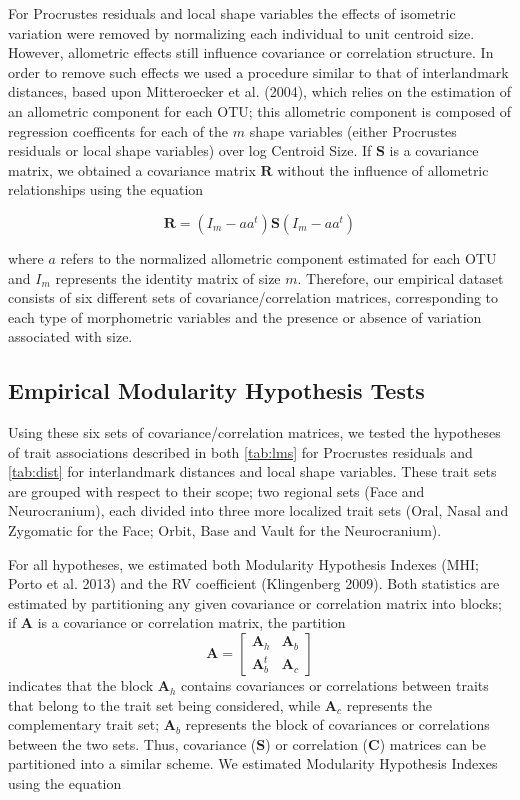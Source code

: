 \documentclass[12pt,]{article}
\begin{document}
For Procrustes residuals and local shape variables the effects of
isometric variation were removed by normalizing each individual to unit
centroid size. However, allometric effects still influence covariance or
correlation structure. In order to remove such effects we used a
procedure similar to that of interlandmark distances, based upon
Mitteroecker et al. (2004), which relies on the estimation of an
allometric component for each OTU; this allometric component is composed
of regression coefficents for each of the $m$ shape variables (either
Procrustes residuals or local shape variables) over log Centroid Size.
If $\mathbf{S}$ is a covariance matrix, we obtained a covariance matrix
$\mathbf{R}$ without the influence of allometric relationships using the
equation

\begin{equation}
\mathbf{R} = (I_m - aa^t) \mathbf{S} (I_m - aa^t)
\label{eq:allo}
\end{equation}

where $a$ refers to the normalized allometric component estimated for
each OTU and $I_m$ represents the identity matrix of size $m$.
Therefore, our empirical dataset consists of six different sets of
covariance/correlation matrices, corresponding to each type of
morphometric variables and the presence or absence of variation
associated with size.

\subsection{Empirical Modularity Hypothesis
Tests}\label{empirical-modularity-hypothesis-tests}

Using these six sets of covariance/correlation matrices, we tested the
hypotheses of trait associations described in both \autoref{tab:lms} for
Procrustes residuals and \autoref{tab:dist} for interlandmark distances
and local shape variables. These trait sets are grouped with respect to
their scope; two regional sets (Face and Neurocranium), each divided
into three more localized trait sets (Oral, Nasal and Zygomatic for the
Face; Orbit, Base and Vault for the Neurocranium).

For all hypotheses, we estimated both Modularity Hypothesis Indexes
(MHI; Porto et al. 2013) and the RV coefficient (Klingenberg 2009). Both
statistics are estimated by partitioning any given covariance or
correlation matrix into blocks; if $\mathbf{A}$ is a covariance or
correlation matrix, the partition \[
\mathbf{A} =
\begin{bmatrix}
\mathbf{A}_h & \mathbf{A}_b \\
\mathbf{A}^t_b & \mathbf{A}_c
\end{bmatrix}
\] indicates that the block $\mathbf{A}_h$ contains covariances or
correlations between traits that belong to the trait set being
considered, while $\mathbf{A}_c$ represents the complementary trait set;
$\mathbf{A}_b$ represents the block of covariances or correlations
between the two sets. Thus, covariance ($\mathbf{S}$) or correlation
($\mathbf{C}$) matrices can be partitioned into a similar scheme. We
estimated Modularity Hypothesis Indexes using the equation
\end{document}
